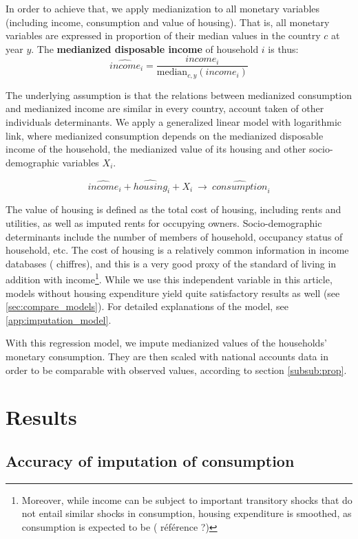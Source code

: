 \documentclass[12pt]{article}
\begin{document}
In order to achieve that, we apply medianization to all monetary variables (including income, consumption and value of housing). That is, all monetary variables are expressed in proportion of their median values in the country $c$ at year $y$. The \textbf{medianized disposable income} of household $i$ is thus:
\[ \widehat{income}_i = \frac{income_i}{\text{median}_{c,y}(income_i)} \]

The underlying assumption is that the relations between medianized consumption and medianized income are similar in every country, account taken of other individuals determinants. We apply a generalized linear model with logarithmic link, where medianized consumption depends on the medianized disposable income of the household, the medianized value of its housing and other socio-demographic variables $X_i$.

\begin{equation}
	\widehat{income}_i + \widehat{housing}_i + X_i \  \rightarrow \  \widehat{consumption}_i
\end{equation}

The value of housing is defined as the total cost of housing, including rents and utilities, as well as imputed rents for occupying owners. Socio-demographic determinants include the number of members of household, occupancy status of household, etc. The cost of housing is a relatively common information in income  databases ({\color{red} chiffres}), and this is a very good proxy of the standard of living in addition with income\footnote{Moreover, while income can be subject to important transitory shocks that do not entail similar shocks in consumption, housing expenditure is smoothed, as consumption is expected to be ({\color{red} référence ?})}. While we use this independent variable in this article, models without housing expenditure yield quite satisfactory results as well (see \cref{sec:compare_models}). For detailed explanations of the model, see \cref{app:imputation_model}.

With this regression model, we impute medianized values of the households' monetary consumption. They are then scaled with national accounts data in order to be comparable with observed values, according to section \ref{subsub:prop}.

\section{Results}


\subsection{Accuracy of imputation of consumption}
\end{document}
